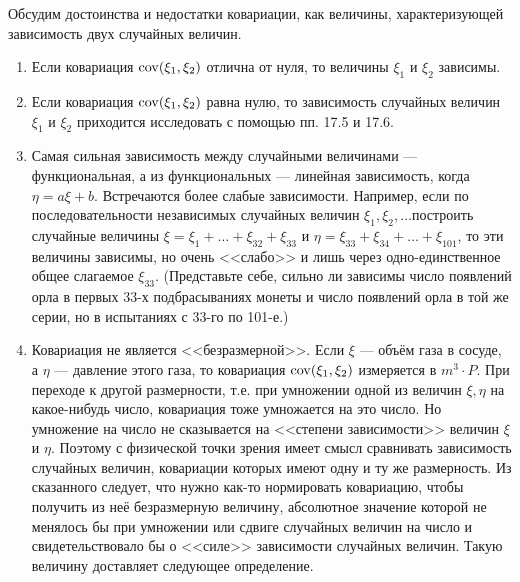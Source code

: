 \begin{zam}\label{zam:19.6}
Обсудим достоинства и недостатки ковариации, как
величины, характеризующей зависимость двух случайных величин.
\begin{enumerate}
	\item Если ковариация $\operatorname{cov}(\xi_1, \xi_2)$ отлична от нуля, то величины 
	$\xi_1$ и $\xi_2$ зависимы.
	
	\item Если ковариация $\operatorname{cov}(\xi_1, \xi_2)$ равна нулю, то зависимость случайных
	величин $\xi_1$ и $\xi_2$ приходится исследовать с помощью пп. 17.5 и 17.6.
	
	\item Самая сильная зависимость между случайными величинами — функциональная, а из функциональных — линейная зависимость, когда $\eta =
	a \xi + b$. Встречаются более слабые зависимости. Например, если по последовательности независимых случайных величин $\xi_1, \xi_2, \dots$построить случайные величины $\xi = \xi_1 +\dots + \xi_{32} + \xi_{33}$ и $\eta = \xi_{33} + \xi_{34}+\dots + \xi_{101}$, то эти
	величины зависимы, но очень <<слабо>> и лишь через одно-единственное общее слагаемое $\xi_{33}$. (Представьте себе, сильно ли зависимы число появлений
	орла в первых 33-х подбрасываниях монеты и число появлений орла в той
	же серии, но в испытаниях с 33-го по 101-е.)

	\item Ковариация не является <<безразмерной>>. Если $\xi$ — объём газа в сосуде, а $\eta$ — давление этого газа, то ковариация $\operatorname{cov}(\xi_1, \xi_2)$ измеряется в $ m^3 \cdot P $. При переходе к другой размерности, т.е. при умножении одной из величин $\xi, \eta$ на какое-нибудь число, ковариация тоже умножается на это число. Но умножение на число не сказывается на <<степени зависимости>> величин $\xi$ и $\eta$. Поэтому с физической точки зрения имеет смысл сравнивать зависимость случайных величин, ковариации которых имеют одну и ту же размерность.
	Из сказанного следует, что нужно как-то нормировать ковариацию,
	чтобы получить из неё безразмерную величину, абсолютное значение которой не менялось бы при умножении или сдвиге случайных величин на число и свидетельствовало бы о <<силе>> зависимости случайных величин.
	Такую величину доставляет следующее определение.
\end{enumerate}
\end{zam}

